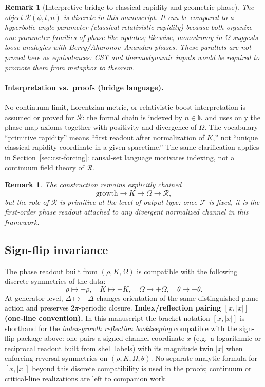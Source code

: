 \documentclass[11pt]{amsart}
\newtheorem{remark}[theorem]{Remark}
\begin{document}
\begin{remark}[Interpretive bridge to classical rapidity and geometric phase]
The object \(\mathcal R(\phi,t,n)\) is discrete in this manuscript. It can be \emph{compared} to a hyperbolic-angle parameter (classical relativistic rapidity) because both organize one-parameter families of phase-like updates; likewise, monodromy in \(\Omega\) suggests loose analogies with Berry/Aharonov--Anandan phases. These parallels are \emph{not} proved here as equivalences: CST and thermodynamic inputs would be required to promote them from metaphor to theorem.
\end{remark}

\paragraph{Interpretation vs.\ proofs (bridge language).}
No continuum limit, Lorentzian metric, or relativistic boost interpretation is assumed or proved for \(\mathcal R\): the formal chain is indexed by \(n\in\mathbb N\) and uses only the phase-map axioms together with positivity and divergence of \(\Omega\). The vocabulary ``primitive rapidity'' means ``first readout after normalization of \(K\),'' not ``unique classical rapidity coordinate in a given spacetime.'' The same clarification applies in Section~\ref{sec:cst-forcing}: causal-set language motivates indexing, not a continuum field theory of \(\mathcal R\).

\begin{remark}
The construction remains explicitly chained
\[
\text{growth}\to K\to \Omega\to \mathcal R,
\]
but the role of \(\mathcal R\) is primitive at the level of output type: once \(\mathcal F\) is fixed, it is the first-order phase readout attached to any divergent normalized channel in this framework.
\end{remark}

\subsection*{Sign-flip invariance}
The phase readout built from \((\rho,K,\Omega)\) is compatible with the following discrete symmetries of the data:
\[
\rho\mapsto -\rho,\quad K\mapsto -K,\quad \Omega\mapsto \pm \Omega,\quad \theta\mapsto -\theta.
\]
At generator level, \(\Delta\mapsto -\Delta\) changes orientation of the same distinguished plane action and preserves \(2\pi\)-periodic closure.
\textbf{Index/reflection pairing \([x,|x|]\) (one-line convention).}
In this manuscript the bracket notation \([x,|x|]\) is shorthand for the \emph{index-growth reflection bookkeeping} compatible with the sign-flip package above: one pairs a signed channel coordinate \(x\) (e.g.\ a logarithmic or reciprocal readout built from shell labels) with its magnitude twin \(|x|\) when enforcing reversal symmetries on \((\rho,K,\Omega,\theta)\). No separate analytic formula for \([x,|x|]\) beyond this discrete compatibility is used in the proofs; continuum or critical-line realizations are left to companion work.
\end{document}
